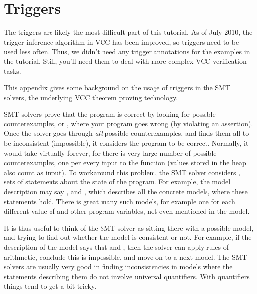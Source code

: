 \section{Triggers}

The triggers are likely the most difficult part of this tutorial.
As of July 2010, the trigger inference algorithm in VCC
has been improved, so triggers need to be used less often.
Thus, we didn't need any trigger annotations for the examples
in the tutorial.
Still, you'll need them to deal with more complex VCC verification
tasks.

This appendix gives some background on the usage of triggers in the 
SMT solvers, the underlying VCC theorem proving technology.

SMT solvers
prove that the program is correct by looking for possible counterexamples,
or , where your program goes wrong (\eg by violating an assertion).
Once the solver goes through \emph{all} possible counterexamples, and finds them
all to be inconsistent (\ie impossible),
it considers the program to be correct.
Normally, it would take virtually forever, for there is very large number of
possible counterexamples, one per every input to the function (values stored in
the heap also count as input).
To workaround this problem, the SMT solver considers
, \ie 
sets of statements about the state of the program.
For example, the model description may say , 
and , which describes all the concrete models, where
these statements hold. There is great many such models,
for example one for each different value of  and other program variables,
not even mentioned in the model.

It is thus useful to think of the SMT solver as sitting there with
a possible model, and trying to find out whether the model is consistent or not.
For example, if the description of the model says that  and
, then the solver can apply rules of arithmetic, conclude this is
impossible, and move on to a next model.
The SMT solvers are usually very good in finding inconsistencies in models
where the statements describing them do not involve universal quantifiers.
With quantifiers things tend to get a bit tricky.

